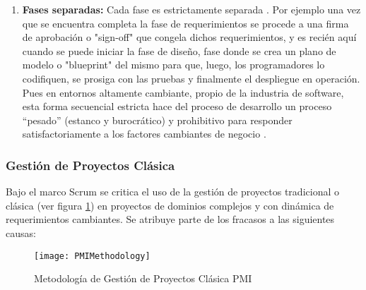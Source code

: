 \begin{enumerate}
\item \textbf{Fases separadas:} \newline
Cada fase es estrictamente separada \cite{Scrum-Institute-2015}. Por ejemplo una vez que se encuentra completa la fase de requerimientos se procede a una firma de aprobación o "sign-off" que congela dichos requerimientos, y es recién aquí cuando se puede iniciar la fase de diseño, fase donde se crea un plano de modelo o "blueprint" del mismo para que, luego, los programadores lo codifiquen, se prosiga con las pruebas y finalmente el despliegue en operación. Pues en entornos altamente cambiante, propio de la industria de software, esta forma secuencial estricta hace del proceso de desarrollo un proceso “pesado” (estanco y burocrático) y prohibitivo para responder satisfactoriamente a los factores cambiantes de negocio \cite{Martin-Alaimo-2014}.

\end{enumerate}

\subsubsection{Gestión de Proyectos Clásica}

Bajo el marco Scrum se critica el uso de la gestión de proyectos tradicional o clásica (ver figura \ref{fig:PMIMethodology}) en proyectos de dominios complejos y con dinámica de requerimientos cambiantes. Se atribuye parte de los fracasos a las siguientes causas:

\begin{figure}[h]
  \centering
  \texttt{[image: PMIMethodology]}
  \caption{Metodología de Gestión de Proyectos Clásica PMI}
  \centering
  \label{fig:PMIMethodology} %
\end{figure}

